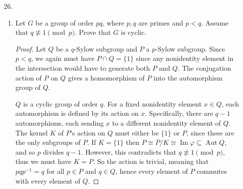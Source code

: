 \documentclass[10pt]{article}
\newcommand{\Z}{\mathbb{Z}}
\DeclareMathOperator*{\Aut}{Aut}
\DeclareMathOperator*{\im}{Im}
\begin{document}
\begin{enumerate}
\begin{enumerate}
\begin{proof}
Now, suppose that $H$ does not contain $Z$.  Then we must have $H \cap Z = \{1\}$, since $Z$ is generated by any one of its nontrivial elements.  So $G = HZ$ by the second isomorphism theorem (since $H$ is normalized by $Z$ and $|HZ| = \frac{|H||Z|}{|H\cap Z|} = p^3$).  But $H$ is abelian, and all of its elements commute with those of $Z$, so for any $h,k \in H$ and $x,y \in Z$ we have
$$
(hx)(ky) = (hk)(xy) = (kh)(yx) = (ky)(hx)
$$
contradicting that $G$ is not abelian.  So $H$ must contain the center.
\end{proof}
\item Suppose $x^p = 1$ for all $x \in G$.  Show that $G$ contains a normal subgroup $H \cong C \times C$.
\begin{proof}
We know that $G/Z \cong C^2$.  $C^2$ has a subgroup of order $p$ (for instance, $C \times \{0\}$), and this subgroup naturally lifts to a subgroup $H$ of $G$ such that $H / Z \cong C$ (by the third isomorphism theorem).  So $|H| = |Z||C| = p^2$.  By part (b), $H$ is normal in $G$.  By exercise 24, $H$ is isomorphic to either $\Z_{p^2}$ or $C^2$.  However, $\Z_{p^2}$ contains an element of order $p^2$, contradicting that $x^p = 1$ for all $x \in G$.  Thus $H \cong C^2$.
\end{proof}
\end{enumerate}
\item[26.]
\begin{enumerate}
\item Let $G$ be a group of order $pq$, where $p,q$ are primes and $p<q$.  Assume that $q \not \equiv 1 \pmod{p}$.  Prove that $G$ is cyclic.
\begin{proof}
Let $Q$ be a $q$-Sylow subgroup and $P$ a $p$-Sylow subgroup.  %
Since $p < q$, we again must have $P \cap Q = \{1\}$ since any nonidentity element in the intersection would have to generate both $P$ and $Q$.  The conjugation action of $P$ on $Q$ gives a homomorphism of $P$ into the automorphism group of $Q$.

$Q$ is a cyclic group of order $q$.  For a fixed nonidentity element $x \in Q$, each automorphism is defined by its action on $x$.  Specifically, there are $q-1$ automorphisms, each sending $x$ to a different nonidentity element of $Q$.  The kernel $K$ of $P$'s action on $Q$ must either be $\{1\}$ or $P$, since these are the only subgroups of $P$.  If $K = \{1\}$ then $P \cong P/K \cong \im \varphi \subseteq \Aut Q$, and so $p$ divides $q-1$.  However, this contradicts that $q \not \equiv 1 \pmod{p}$, thus we must have $K = P$.  So the action is trivial, meaning that $pqp^{-1} = q$ for all $p \in P$ and $q \in Q$, hence every element of $P$ commutes with every element of $Q$.


\end{proof}
\end{enumerate}
\end{enumerate}
\end{document}
